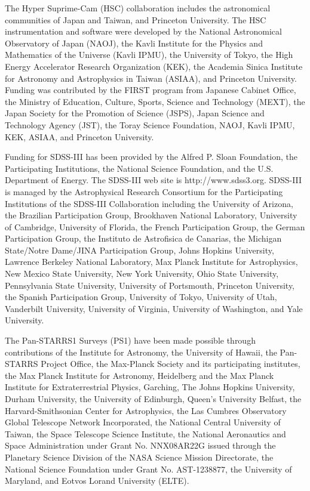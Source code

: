 \documentclass{emulateapj}
\begin{document}
\begin{CJK*}{UTF8}{gbsn}
  The Hyper Suprime-Cam (HSC) collaboration includes the astronomical communities of Japan
  and Taiwan, and Princeton University.  The HSC instrumentation and software were
  developed by the National Astronomical Observatory of Japan (NAOJ), the Kavli Institute
  for the Physics and Mathematics of the Universe (Kavli IPMU), the University of Tokyo,
  the High Energy Accelerator Research Organization (KEK), the Academia Sinica Institute
  for Astronomy and Astrophysics in Taiwan (ASIAA), and Princeton University.  Funding was
  contributed by the FIRST program from Japanese Cabinet Office, the Ministry of
  Education, Culture, Sports, Science and Technology (MEXT), the Japan Society for the
  Promotion of Science (JSPS), Japan Science and Technology Agency (JST),  the Toray
  Science  Foundation, NAOJ, Kavli IPMU, KEK, ASIAA, and Princeton University.
   
  Funding for SDSS-III has been provided by the Alfred P. Sloan Foundation, the
  Participating Institutions, the National Science Foundation, and the U.S.  Department of
  Energy. The SDSS-III web site is http://www.sdss3.org.  SDSS-III is managed by the
  Astrophysical Research Consortium for the Participating Institutions of the SDSS-III
  Collaboration including the University of Arizona, the Brazilian Participation Group,
  Brookhaven National Laboratory, University of Cambridge, University of Florida, the
  French Participation Group, the German Participation Group, the Instituto de Astrofisica
  de Canarias, the Michigan State/Notre Dame/JINA Participation Group, Johns Hopkins
  University, Lawrence Berkeley National Laboratory, Max Planck Institute for
  Astrophysics, New Mexico State University, New York University, Ohio State University,
  Pennsylvania State University, University of Portsmouth, Princeton University, the
  Spanish Participation Group, University of Tokyo, University of Utah, Vanderbilt
  University, University of Virginia, University of Washington, and Yale University.
  
  The Pan-STARRS1 Surveys (PS1) have been made possible through contributions of the 
  Institute for Astronomy, the University of Hawaii, the Pan-STARRS Project Office, 
  the Max-Planck Society and its participating institutes, the Max Planck Institute 
  for Astronomy, Heidelberg and the Max Planck Institute for Extraterrestrial Physics, 
  Garching, The Johns Hopkins University, Durham University, the University of Edinburgh, 
  Queen's University Belfast, the Harvard-Smithsonian Center for Astrophysics, the Las 
  Cumbres Observatory Global Telescope Network Incorporated, the National Central 
  University of Taiwan, the Space Telescope Science Institute, the National Aeronautics 
  and Space Administration under Grant No. NNX08AR22G issued through the Planetary 
  Science Division of the NASA Science Mission Directorate, the National Science 
  Foundation under Grant No. AST-1238877, the University of Maryland, and Eotvos 
  Lorand University (ELTE).
  

\end{CJK*}
\end{document}
